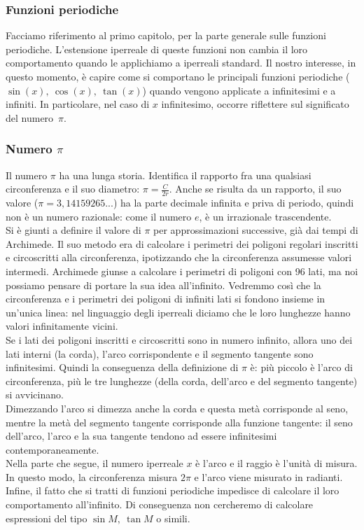 \subsubsection{Funzioni periodiche}
\label{subsubsec:insnum_periodiche}
Facciamo riferimento al primo capitolo, per la parte generale 
sulle funzioni periodiche. L'estensione iperreale di queste funzioni
non cambia il loro comportamento quando le applichiamo a iperreali standard.
Il nostro interesse, in questo momento, è capire come si comportano
le principali funzioni periodiche ($\sin(x),\ \cos(x),\ \tan(x)$)
quando vengono applicate a infinitesimi e a infiniti. In particolare,
nel caso di $x$ infinitesimo, occorre riflettere sul significato del
numero~$\pi$.

\subsubsection{Numero $\pi$}
\label{subsubsec:insnum_pigreco}
Il numero $\pi$ ha una lunga storia. Identifica 
il rapporto fra una qualsiasi circonferenza e il suo diametro: 
$\pi=\frac{C}{2r}$. 
Anche se risulta da un rapporto, il suo valore ($\pi=3,14159265...$) 
ha la parte decimale infinita e priva di periodo, quindi non è un numero 
razionale: come il numero $e$, è un irrazionale trascendente.\\
Si è giunti a definire il valore di \(\pi\) per approssimazioni
successive, già dai tempi di Archimede. Il suo metodo era di
calcolare i perimetri dei poligoni regolari inscritti e
circoscritti alla circonferenza, ipotizzando che la circonferenza
assumesse valori intermedi. Archimede giunse a calcolare i perimetri
di poligoni con 96 lati, ma noi possiamo pensare di portare la sua idea
all'infinito. Vedremmo così che la circonferenza e i perimetri dei poligoni 
di infiniti lati si fondono insieme in un'unica linea: nel linguaggio degli
iperreali diciamo che le loro lunghezze hanno valori infinitamente vicini.\\
Se i lati dei poligoni inscritti e circoscritti sono in numero infinito,
allora uno dei lati interni (la corda), l'arco corrispondente e il segmento 
tangente
sono infinitesimi. Quindi la conseguenza della definizione di \(\pi\) è:
più piccolo è l'arco di circonferenza, più le tre lunghezze (della corda, 
dell'arco e del segmento tangente) si avvicinano.\\
Dimezzando l'arco si dimezza anche la corda e questa metà corrisponde al seno,
mentre la metà del segmento tangente corrisponde alla funzione tangente:
il seno dell'arco, l'arco e la sua tangente tendono  ad essere 
infinitesimi contemporaneamente.\\
Nella parte che segue, il numero iperreale $x$ è l'arco e il raggio è l'unità 
di misura. In questo modo, la circonferenza misura $2\pi$ e l'arco 
viene misurato in radianti.\\
Infine, il fatto che si tratti di funzioni periodiche impedisce di calcolare
il loro comportamento all'infinito. Di conseguenza non cercheremo di 
calcolare 
espressioni del tipo $\sin M,\ \tan M$ o simili.\\


